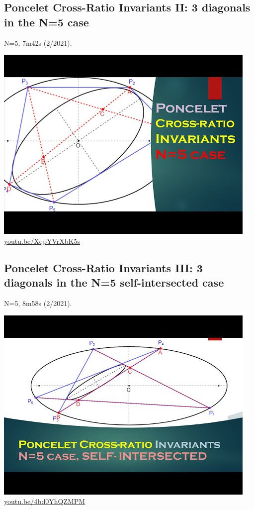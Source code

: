 \documentclass[12pt]{amsart}
\begin{document}
\subsection{Poncelet Cross-Ratio Invariants II: 3 diagonals in the N=5 case}
\label{vid:XqpYVrXbK5s}
\noindent N=5, 7m42s (2/2021). 
\begin{center}\includegraphics[width=.5\textwidth]{pics/XqpYVrXbK5s.jpg} \\ 
\href{https://youtu.be/XqpYVrXbK5s}{\url{youtu.be/XqpYVrXbK5s}}\end{center}
% 

\subsection{Poncelet Cross-Ratio Invariants III: 3 diagonals in the N=5 self-intersected case}
\label{vid:4bd0YhQZMPM}
\noindent N=5, 8m58s (2/2021). 
\begin{center}\includegraphics[width=.5\textwidth]{pics/4bd0YhQZMPM.jpg} \\ 
\href{https://youtu.be/4bd0YhQZMPM}{\url{youtu.be/4bd0YhQZMPM}}\end{center}
% 
\end{document}
